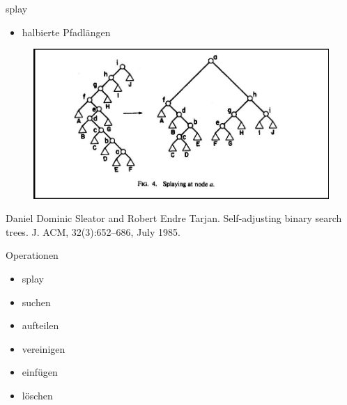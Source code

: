 \documentclass[11pt]{beamer}
\begin{document}
	\begin{frame}{splay}
		\begin{itemize}
			\item halbierte Pfadlängen
		\end{itemize}
		\pause
		\begin{figure}[h]
			\centering
			\includegraphics[height=0.50\textwidth]{"bilder/halberPfad1"}	
		\end{figure}
		\scriptsize  {Daniel Dominic Sleator and Robert Endre Tarjan. Self-adjusting binary search trees. J. ACM, 32(3):652–686, July 1985.}
		
	\end{frame}	
		\begin{frame}{Operationen}
		
		\begin{itemize}
			
			\item \color {gray}splay
			\item \color {black}suchen
			\item \color {gray}aufteilen
			\item vereinigen
			\item einfügen
			\item löschen
		\end{itemize}
	\end{frame}		
\end{document}
